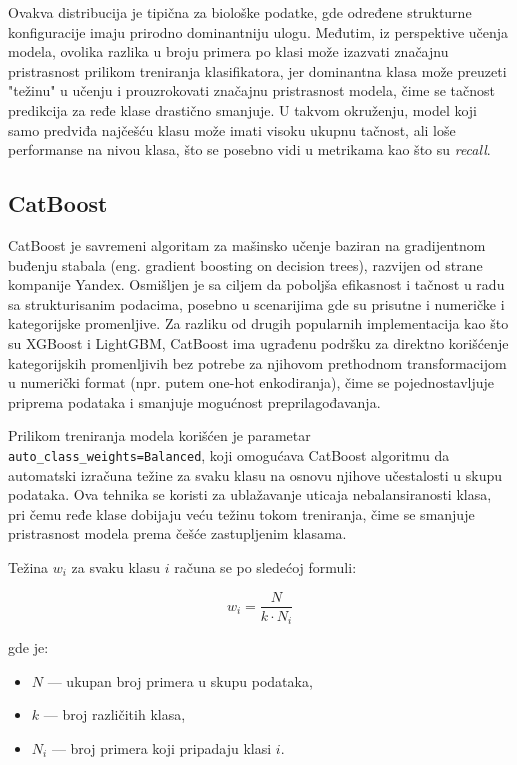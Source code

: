 \documentclass[a4paper,12pt]{article}
\begin{document}
Ovakva distribucija je tipična za biološke podatke, gde određene strukturne konfiguracije imaju prirodno dominantniju ulogu. Međutim, iz perspektive učenja modela, ovolika razlika u broju primera po klasi može izazvati značajnu pristrasnost prilikom treniranja klasifikatora, jer dominantna klasa može preuzeti "težinu" u učenju i prouzrokovati značajnu pristrasnost modela, čime se tačnost predikcija za ređe klase drastično smanjuje. U takvom okruženju, model koji samo predviđa najčešću klasu može imati visoku ukupnu tačnost, ali loše performanse na nivou klasa, što se posebno vidi u metrikama kao što su \textit{recall}.
\\

\subsection{CatBoost}

CatBoost je savremeni algoritam za mašinsko učenje baziran na gradijentnom buđenju stabala (eng. gradient boosting on decision trees), razvijen od strane kompanije Yandex. Osmišljen je sa ciljem da poboljša efikasnost i tačnost u radu sa strukturisanim podacima, posebno u scenarijima gde su prisutne i numeričke i kategorijske promenljive. Za razliku od drugih popularnih implementacija kao što su XGBoost i LightGBM, CatBoost ima ugrađenu podršku za direktno korišćenje kategorijskih promenljivih bez potrebe za njihovom prethodnom transformacijom u numerički format (npr. putem one-hot enkodiranja), čime se pojednostavljuje priprema podataka i smanjuje mogućnost preprilagođavanja.

Prilikom treniranja modela korišćen je parametar \texttt{auto\_class\_weights=\textquotesingle Balanced\textquotesingle}, koji omogućava CatBoost algoritmu da automatski izračuna težine za svaku klasu na osnovu njihove učestalosti u skupu podataka. Ova tehnika se koristi za ublažavanje uticaja nebalansiranosti klasa, pri čemu ređe klase dobijaju veću težinu tokom treniranja, čime se smanjuje pristrasnost modela prema češće zastupljenim klasama.

Težina $w_i$ za svaku klasu $i$ računa se po sledećoj formuli:

\[
w_i = \frac{N}{k \cdot N_i}
\]

gde je:
\begin{itemize}
    \item $N$ --- ukupan broj primera u skupu podataka,
    \item $k$ --- broj različitih klasa,
    \item $N_i$ --- broj primera koji pripadaju klasi $i$.
\end{itemize}
\end{document}
